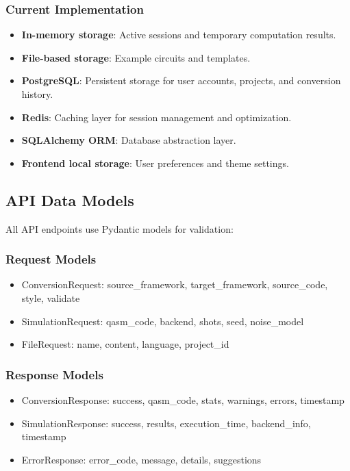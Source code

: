 \subsubsection{Current Implementation}
\begin{itemize}
    \item \textbf{In-memory storage}: Active sessions and temporary computation results.
    \item \textbf{File-based storage}: Example circuits and templates.
    \item \textbf{PostgreSQL}: Persistent storage for user accounts, projects, and conversion history.
    \item \textbf{Redis}: Caching layer for session management and optimization.
    \item \textbf{SQLAlchemy ORM}: Database abstraction layer.
    \item \textbf{Frontend local storage}: User preferences and theme settings.
\end{itemize}

\subsection{API Data Models}

All API endpoints use Pydantic models for validation:

\subsubsection{Request Models}
\begin{itemize}
    \item ConversionRequest: source\_framework, target\_framework, source\_code, style, validate
    \item SimulationRequest: qasm\_code, backend, shots, seed, noise\_model
    \item FileRequest: name, content, language, project\_id
\end{itemize}

\subsubsection{Response Models}
\begin{itemize}
    \item ConversionResponse: success, qasm\_code, stats, warnings, errors, timestamp
    \item SimulationResponse: success, results, execution\_time, backend\_info, timestamp
    \item ErrorResponse: error\_code, message, details, suggestions
\end{itemize}

 
